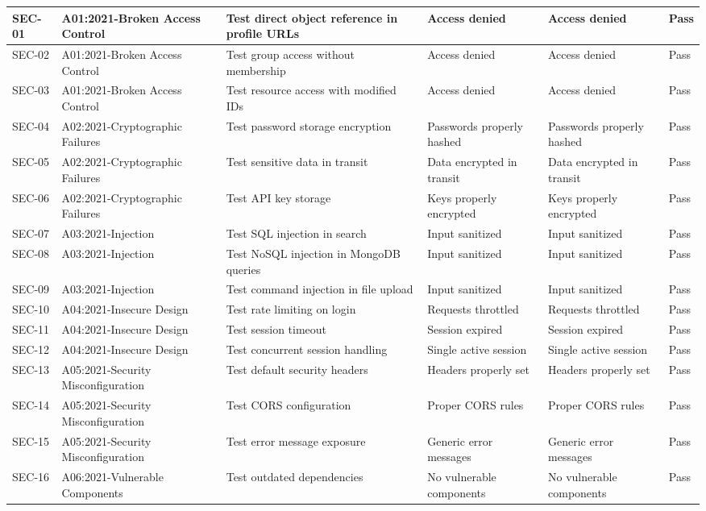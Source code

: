 {\begin{longtable}{|p{1.5cm}|p{2.5cm}|p{3.5cm}|p{2.5cm}|p{2.5cm}|p{1.5cm}|}
SEC-01 & A01:2021-Broken Access Control & Test direct object reference in profile URLs & Access denied & Access denied & Pass \\
\hline
SEC-02 & A01:2021-Broken Access Control & Test group access without membership & Access denied & Access denied & Pass \\
\hline
SEC-03 & A01:2021-Broken Access Control & Test resource access with modified IDs & Access denied & Access denied & Pass \\
\hline
SEC-04 & A02:2021-Cryptographic Failures & Test password storage encryption & Passwords properly hashed & Passwords properly hashed & Pass \\
\hline
SEC-05 & A02:2021-Cryptographic Failures & Test sensitive data in transit & Data encrypted in transit & Data encrypted in transit & Pass \\
\hline
SEC-06 & A02:2021-Cryptographic Failures & Test API key storage & Keys properly encrypted & Keys properly encrypted & Pass \\
\hline
SEC-07 & A03:2021-Injection & Test SQL injection in search & Input sanitized & Input sanitized & Pass \\
\hline
SEC-08 & A03:2021-Injection & Test NoSQL injection in MongoDB queries & Input sanitized & Input sanitized & Pass \\
\hline
SEC-09 & A03:2021-Injection & Test command injection in file upload & Input sanitized & Input sanitized & Pass \\
\hline
SEC-10 & A04:2021-Insecure Design & Test rate limiting on login & Requests throttled & Requests throttled & Pass \\
\hline
SEC-11 & A04:2021-Insecure Design & Test session timeout & Session expired & Session expired & Pass \\
\hline
SEC-12 & A04:2021-Insecure Design & Test concurrent session handling & Single active session & Single active session & Pass \\
\hline
SEC-13 & A05:2021-Security Misconfiguration & Test default security headers & Headers properly set & Headers properly set & Pass \\
\hline
SEC-14 & A05:2021-Security Misconfiguration & Test CORS configuration & Proper CORS rules & Proper CORS rules & Pass \\
\hline
SEC-15 & A05:2021-Security Misconfiguration & Test error message exposure & Generic error messages & Generic error messages & Pass \\
\hline
SEC-16 & A06:2021-Vulnerable Components & Test outdated dependencies & No vulnerable components & No vulnerable components & Pass \\

\end{longtable}}
